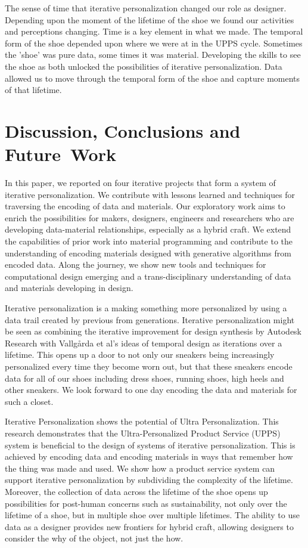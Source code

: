 The sense of time that iterative personalization changed our role as designer. Depending upon the moment of the lifetime of the shoe we found our activities and perceptions changing. Time is a key element in what we made. The temporal form of the shoe depended upon where we were at in the UPPS cycle. Sometimes the 'shoe' was pure data, some times it was material. Developing the skills to see the shoe as both unlocked the possibilities of iterative personalization. Data allowed us to move through the temporal form of the shoe and capture moments of that lifetime. 

\section{Discussion, Conclusions and Future~Work}
In this paper, we reported on four iterative projects that form a system of iterative personalization. We contribute with lessons learned and techniques for traversing the encoding of data and materials. Our exploratory work aims to enrich the possibilities for makers, designers, engineers and researchers who are developing data-material relationships, especially as a hybrid craft. We extend the capabilities of prior work into material programming \cite{Vallgarda2016} and contribute to the understanding of encoding materials designed with generative algorithms from encoded data. Along the journey, we show new tools and techniques for computational design emerging and a trans-disciplinary understanding of data and materials developing in design. 

Iterative personalization is a making something more personalized by using a data trail created by previous from generations. Iterative personalization might be seen as combining the iterative improvement for design synthesis by Autodesk Research \cite{Nourbakhsh2016} with Vallg\aa rda et al's ideas of temporal design \cite{Vallgarda2015} as iterations over a lifetime.  This opens up a door to not only our sneakers being increasingly personalized every time they become worn out, but that these sneakers encode data for all of our shoes including dress shoes, running shoes, high heels and other sneakers. We look forward to one day encoding the data and materials for such a closet. 

Iterative Personalization shows the potential of Ultra Personalization. This research demonstrates that the Ultra-Personalized Product Service (UPPS) system is beneficial to the design of systems of iterative personalization. This is achieved by encoding data and encoding materials in ways that remember how the thing was made and used. We show how a product service system can support iterative personalization by subdividing the complexity of the lifetime. Moreover, the collection of data across the lifetime of the shoe opens up possibilities for  post-human concerns such as sustainability, not only over the lifetime of a shoe, but in multiple shoe over multiple lifetimes. The ability to use data as a designer provides new frontiers for hybrid craft, allowing designers to consider the why of the object, not just the how. 

